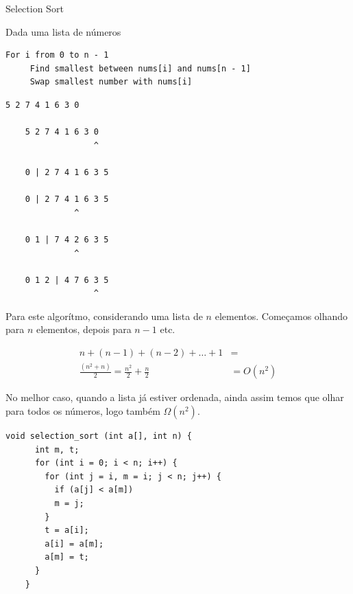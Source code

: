 \documentclass{beamer}
\begin{document}
\begin{frame}{Selection Sort}

  Dada uma lista de números

  \begin{lstlisting}[style=code,basicstyle=\ttfamily\scriptsize]
    For i from 0 to n - 1
     Find smallest between nums[i] and nums[n - 1]
     Swap smallest number with nums[i]
  \end{lstlisting}

  \framebreak

  \begin{lstlisting}[style=code]
    5 2 7 4 1 6 3 0

    5 2 7 4 1 6 3 0
                  ^

    0 | 2 7 4 1 6 3 5
    
    0 | 2 7 4 1 6 3 5
              ^    

    0 1 | 7 4 2 6 3 5
              ^
	  
    0 1 2 | 4 7 6 3 5
                  ^
  \end{lstlisting}

  \framebreak

  Para este algorítmo, considerando uma lista de $n$
  elementos. Começamos olhando para $n$ elementos, depois para $n - 1$
  etc.

  \begin{align*}
    n + (n - 1) + (n - 2) + \ldots + 1 & = \\
    \frac{(n^2 + n)}{2} = \frac{n^2}{2} + \frac{n}{2} & = O(n^2) 
  \end{align*}

  No melhor caso, quando a lista já estiver ordenada, ainda assim
  temos que olhar para todos os números, logo também $\Omega(n^2)$.
  
  \framebreak

  \begin{lstlisting}[style=normalc,caption=src/selection.c]
    void selection_sort (int a[], int n) {
      int m, t;
      for (int i = 0; i < n; i++) {
        for (int j = i, m = i; j < n; j++) {
          if (a[j] < a[m])
          m = j;
        }
        t = a[i];
        a[i] = a[m];
        a[m] = t;
      }
    }
  \end{lstlisting}

\end{frame}
\end{document}
